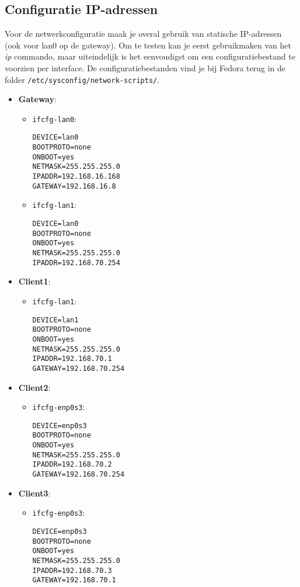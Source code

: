 \documentclass{report}
\begin{document}
\subsection{Configuratie IP-adressen}
Voor de netwerkconfiguratie maak je overal gebruik van statische IP-adressen (ook voor lan0 op de gateway). Om te testen kan je eerst gebruikmaken van het \textit{ip} commando, maar uiteindelijk is het eenvoudigst om een configuratiebestand te voorzien per interface. De configuratiebestanden vind je bij Fedora terug in de folder \texttt{/etc/sysconfig/network-scripts/}. 
\begin{itemize}
	\item \textbf{Gateway}: \begin{itemize}
								\item \texttt{ifcfg-lan0}:
									  		\begin{lstlisting}
DEVICE=lan0
BOOTPROTO=none
ONBOOT=yes
NETMASK=255.255.255.0
IPADDR=192.168.16.168
GATEWAY=192.168.16.8
											\end{lstlisting}
								\item \texttt{ifcfg-lan1}:
\begin{lstlisting}
DEVICE=lan0
BOOTPROTO=none
ONBOOT=yes
NETMASK=255.255.255.0
IPADDR=192.168.70.254
\end{lstlisting}											
							\end{itemize}
	\item \textbf{Client1}: 
	\begin{itemize}
		\item \texttt{ifcfg-lan1}:
		\begin{lstlisting}
DEVICE=lan1
BOOTPROTO=none
ONBOOT=yes
NETMASK=255.255.255.0
IPADDR=192.168.70.1
GATEWAY=192.168.70.254
		\end{lstlisting}										
	\end{itemize}

	\item \textbf{Client2}: 
\begin{itemize}
	\item \texttt{ifcfg-enp0s3}:
	\begin{lstlisting}
DEVICE=enp0s3
BOOTPROTO=none
ONBOOT=yes
NETMASK=255.255.255.0
IPADDR=192.168.70.2
GATEWAY=192.168.70.254
	\end{lstlisting}										
\end{itemize}

	\item \textbf{Client3}: 
\begin{itemize}
	\item \texttt{ifcfg-enp0s3}:
	\begin{lstlisting}
DEVICE=enp0s3
BOOTPROTO=none
ONBOOT=yes
NETMASK=255.255.255.0
IPADDR=192.168.70.3
GATEWAY=192.168.70.1
	\end{lstlisting}										
\end{itemize}

\end{itemize}
\end{document}
